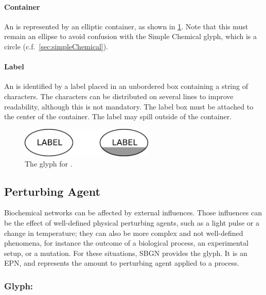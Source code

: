 \paragraph{Container}

An  is represented by an
elliptic container, as shown in \ref{fig:unspecified}.  Note that this
must remain an ellipse to avoid confusion with the Simple Chemical
glyph, which is a circle (c.f.\, \ref{sec:simpleChemical}).

\paragraph{Label}

An  is identified by a label
placed in an unbordered box containing a string of characters.  The
characters can be distributed on several lines to improve readability,
although this is not mandatory.  The label box must be attached to the
center of the container.  The label may spill outside of the
container.

\begin{figure}[H]
  \centering
  \includegraphics[width=2.5in]{images/unspecified}
  \caption{The \PD glyph for .}
  \label{fig:unspecified}
\end{figure}

\subsection{Perturbing Agent}
\label{sec:perturbing agent}

Biochemical networks can be affected by external influences.  Those
influences can be the effect of well-defined physical perturbing agents, such as a light
pulse or a change in temperature; they can also be more complex and not
well-defined phenomena, for instance the outcome of a biological process, an experimental
setup, or a mutation.  For these situations, SBGN provides the
 glyph. It is an EPN, and represents the amount to perturbing agent applied to a process.  

\subsubsection{Glyph: }

